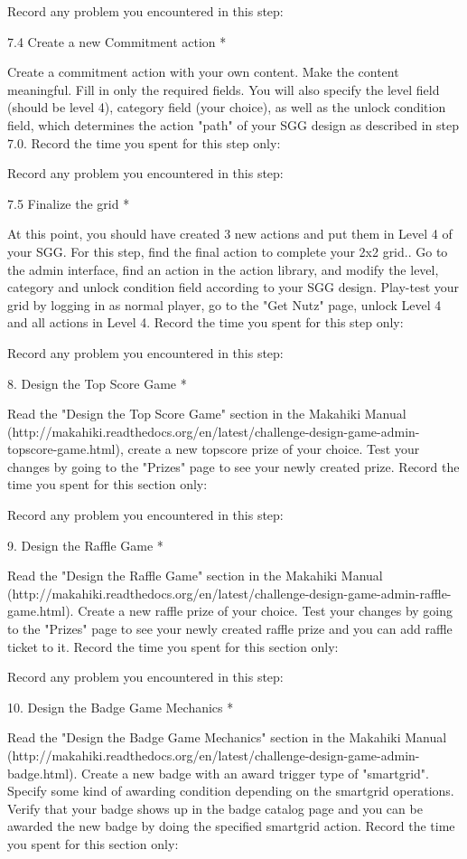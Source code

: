Record any problem you encountered in this step:

7.4 Create a new Commitment action *

Create a commitment action with your own content. Make the content meaningful. Fill in only the required fields. You will also specify the level field (should be level 4), category field (your choice), as well as the unlock condition field, which determines the action "path" of your SGG design as described in step 7.0. Record the time you spent for this step only:

Record any problem you encountered in this step:

7.5 Finalize the grid *

At this point, you should have created 3 new actions and put them in Level 4 of your SGG. For this step, find the final action to complete your 2x2 grid.. Go to the admin interface, find an action in the action library, and modify the level, category and unlock condition field according to your SGG design. Play-test your grid by logging in as normal player, go to the "Get Nutz" page, unlock Level 4 and all actions in Level 4. Record the time you spent for this step only:

Record any problem you encountered in this step:

8. Design the Top Score Game *

Read the "Design the Top Score Game" section in the Makahiki Manual (http://makahiki.readthedocs.org/en/latest/challenge-design-game-admin-topscore-game.html), create a new topscore prize of your choice. Test your changes by going to the "Prizes" page to see your newly created prize. Record the time you spent for this section only:

Record any problem you encountered in this step:

9. Design the Raffle Game *

Read the "Design the Raffle Game" section in the Makahiki Manual (http://makahiki.readthedocs.org/en/latest/challenge-design-game-admin-raffle-game.html). Create a new raffle prize of your choice. Test your changes by going to the "Prizes" page to see your newly created raffle prize and you can add raffle ticket to it. Record the time you spent for this section only:

Record any problem you encountered in this step:

10. Design the Badge Game Mechanics *

Read the "Design the Badge Game Mechanics" section in the Makahiki Manual (http://makahiki.readthedocs.org/en/latest/challenge-design-game-admin-badge.html). Create a new badge with an award trigger type of "smartgrid". Specify some kind of awarding condition depending on the smartgrid operations. Verify that your badge shows up in the badge catalog page and you can be awarded the new badge by doing the specified smartgrid action. Record the time you spent for this section only:

